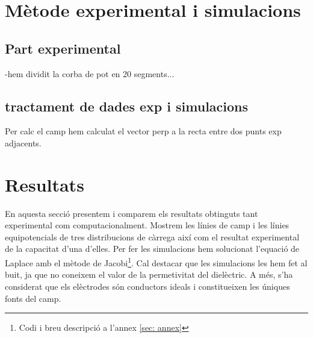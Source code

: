 \documentclass[11pt]{article}
\begin{document}
\section{Mètode experimental i simulacions}\label{sec: metode}
\subsection{Part experimental}
-hem dividit la corba de pot en 20 segments...

\subsection{tractament de dades exp i simulacions}
Per calc el camp hem calculat el vector perp a la recta entre dos punts exp adjacents.

\section{Resultats}\label{sec: resultats}
En aquesta secció presentem i comparem els resultats obtinguts tant experimental com computacionalment. Mostrem les línies de camp i les línies equipotencials de tres distribucions de càrrega així com el resultat experimental de la capacitat d'una d'elles. Per fer les simulacions hem solucionat l'equació de Laplace amb el mètode de Jacobi\footnote{Codi i breu descripció a l'annex \ref{sec: annex}}. Cal destacar que les simulacions les hem fet al buit, ja que no coneixem el valor de la permetivitat del dielèctric. A més, s'ha considerat que els elèctrodes són conductors ideals i constitueixen les úniques fonts del camp.
\end{document}
